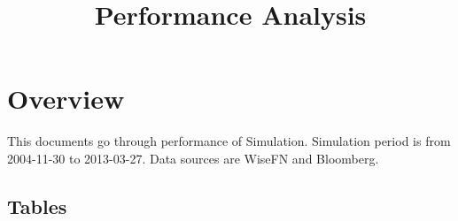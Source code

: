 \documentclass{article}
\begin{document}




\title{Performance Analysis}
\author{}
\date{}

\maketitle


\section{Overview}
This documents go through performance of Simulation. Simulation period is from 2004-11-30 to 2013-03-27. Data sources are WiseFN and Bloomberg.

\subsection{Tables}
\end{document}

